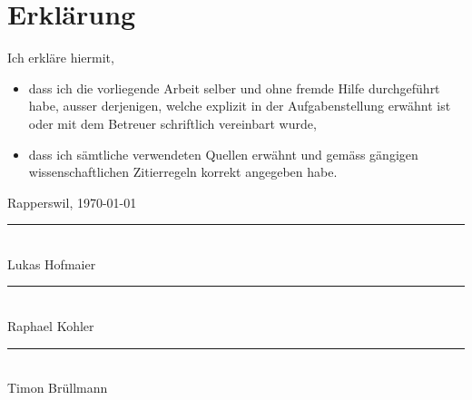 \chapter*{Erklärung}
\label{cha:declaration}


Ich erkläre hiermit,
\begin{itemize}
\item dass ich die vorliegende Arbeit selber und oh\-ne frem\-de Hil\-fe durch\-ge\-führt habe, ausser derjenigen, welche explizit in der Aufgabenstellung erwähnt ist oder mit dem Betreuer schriftlich vereinbart wurde,
\item dass ich sämtliche verwendeten Quellen erwähnt und gemäss gängigen wissenschaftlichen Zitierregeln korrekt angegeben habe.
\end{itemize}

\vspace{1cm}

\noindent
Rapperswil, \today

\vspace{1.5cm}

\noindent
\rule{6cm}{0.4pt}
\noindent
\vspace{0.5cm} \\
Lukas Hofmaier


\vspace{1.5cm}

\noindent
\rule{6cm}{0.4pt}
\noindent
\vspace{0.5cm} \\
Raphael Kohler


\vspace{1.5cm}

\noindent
\rule{6cm}{0.4pt}
\noindent
\vspace{0.5cm} \\
Timon Brüllmann
